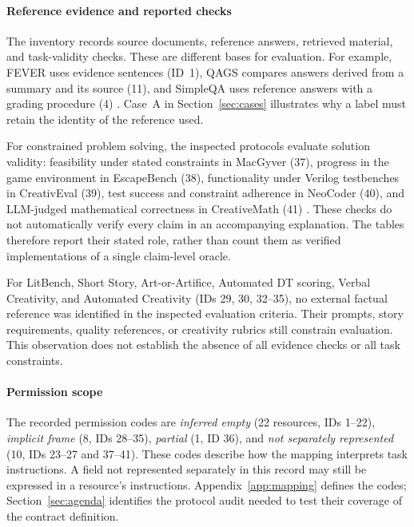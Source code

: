 \documentclass{clv2025}
\begin{document}
\paragraph{Reference evidence and reported checks}
The inventory records source documents, reference answers, retrieved
material, and task-validity checks. These are different bases for evaluation.
For example, FEVER uses evidence sentences (ID~1), QAGS compares answers
derived from a summary and its source (11), and SimpleQA uses reference
answers with a grading procedure (4)
\citep{thorne_fever_2018,wang_asking_2020,wei_measuring_2024}.
Case~A in Section~\ref{sec:cases} illustrates why a label must retain the
identity of the reference used.

For constrained problem solving, the inspected protocols evaluate solution
validity: feasibility under stated constraints in MacGyver (37), progress
in the game environment in EscapeBench (38), functionality under Verilog
testbenches in CreativEval (39), test success and constraint adherence in
NeoCoder (40), and LLM-judged mathematical correctness in CreativeMath (41)
\citep{tian_macgyver_2025,qian_escapebench_2025,delorenzo_creativeval_2024,
lu_benchmarking_2025,ye_assessing_2025}. These checks do not automatically
verify every claim in an accompanying explanation. The tables therefore
report their stated role, rather than count them as verified implementations
of a single claim-level oracle.

For LitBench, Short Story, Art-or-Artifice, Automated DT scoring, Verbal
Creativity, and Automated Creativity (IDs 29, 30, 32--35), no external
factual reference was identified in the inspected evaluation criteria.
Their prompts, story requirements, quality references, or creativity
rubrics still constrain evaluation. This observation does not establish
the absence of all evidence checks or all task constraints.

\paragraph{Permission scope}
The recorded permission codes are \emph{inferred empty} (22 resources,
IDs 1--22), \emph{implicit frame} (8, IDs 28--35), \emph{partial} (1, ID 36),
and \emph{not separately represented} (10, IDs 23--27 and 37--41).
These codes describe how the mapping interprets task instructions. A field
not represented separately in this record may still be expressed in a
resource's instructions. Appendix~\ref{app:mapping} defines the codes;
Section~\ref{sec:agenda} identifies the protocol audit needed to test their
coverage of the contract definition.
\end{document}
